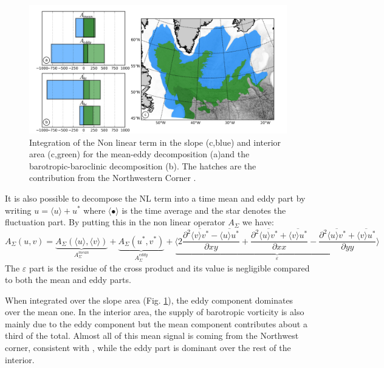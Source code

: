 \documentclass[os, manuscript]{copernicus}
\begin{document}
\begin{figure}[t]
\includegraphics[width=14cm]{../fig_os/f13.pdf}
\caption{Integration of the Non linear term in the slope (c,blue) and interior area (c,green) for the mean-eddy decomposition (a)and the barotropic-baroclinic decomposition (b). The hatches are the contribution from the Northwestern Corner .}
\label{f13}
\end{figure} 

It is also possible to decompose the NL term into a time mean and eddy part by writing $u = \langle u \rangle + u^*$ where $\langle \bullet\rangle$ is the time average and the star denotes the fluctuation part. By putting this in the non linear operator $A_{\Sigma}$ we have:
\begin{equation}
A_{\Sigma}(u,v)=\underbrace{A_{\Sigma}(\langle u \rangle, \langle v \rangle)}_{A_{\Sigma}^{mean}} + \underbrace{A_{\Sigma}(u^*,v^*)}_{A_{\Sigma}^{eddy}} +\underbrace{\langle  2\frac{\partial ^2 \overline{\langle v \rangle v^*} -\overline{\langle u \rangle u^*}}{\partial xy} +\frac{\partial ^2 \overline{\langle u \rangle v^*} + \overline{\langle v \rangle u^*}}{\partial xx} - \frac{\partial ^2 \overline{\langle u \rangle v^*} +\overline{ \langle v \rangle u^*}}{\partial yy}\rangle}_{\varepsilon}
\end{equation}
The $\varepsilon$ part is the residue of the cross product and its value is negligible compared to both the mean and eddy parts. 

When integrated over the slope area (Fig. \ref{f13}), the eddy component dominates over the mean one. In the interior area, the supply of barotropic vorticity is also mainly due to the eddy component but the mean component contributes about a third of the total. Almost all of this mean signal is coming from the Northwest corner, consistent with \citet{wang2017}, while the eddy part is dominant over the rest of the interior. 
\end{document}
